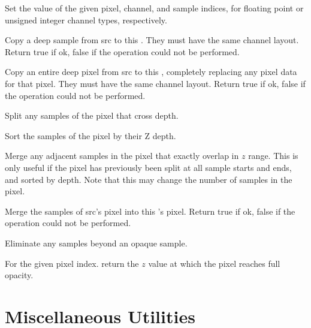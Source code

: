 Set the value of the given pixel, channel, and sample indices, for
floating point or unsigned integer channel types, respectively.
\apiend

Copy a deep sample from {\cf src} to this \DeepData. They must have the same
channel layout. Return {\cf true} if ok, {\cf false} if the operation could
not be performed.
\apiend

Copy an entire deep pixel from {\cf src} to this \DeepData, completely
replacing any pixel data for that pixel. They must have the same channel
layout. Return {\cf true} if ok, {\cf false} if the operation could not be
performed.
\apiend

Split any samples of the pixel that cross {\cf depth}.
\apiend

Sort the samples of the pixel by their Z depth.
\apiend

Merge any adjacent samples in the pixel that exactly overlap in $z$
range. This is only useful if the pixel has previously been split at
all sample starts and ends, and sorted by depth. Note that this may change
the number of samples in the pixel.
\apiend

Merge the samples of {\cf src}'s pixel into this \DeepData's pixel.
Return {\cf true} if ok, {\cf false} if the operation could not be
performed.
\apiend

Eliminate any samples beyond an opaque sample.
\apiend

\NEW %
For the given pixel index. return the $z$ value at which the pixel reaches
full opacity.
\apiend


\section{Miscellaneous Utilities}
\label{sec:miscapi}

